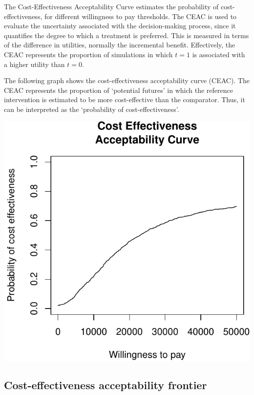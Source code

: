 \documentclass[]{article}
\begin{document}
The Cost-Effectiveness Acceptability Curve estimates the probability of
cost-effectiveness, for different willingness to pay thresholds. The
CEAC is used to evaluate the uncertainty associated with the
decision-making process, since it quantifies the degree to which a
treatment is preferred. This is measured in terms of the difference in
utilities, normally the incremental benefit. Effectively, the CEAC
represents the proportion of simulations in which \(t=1\) is associated
with a higher utility than \(t=0\).

The following graph shows the cost-effectiveness acceptability curve
(CEAC). The CEAC represents the proportion of `potential futures' in
which the reference intervention is estimated to be more cost-effective
than the comparator. Thus, it can be interpreted as the `probability of
cost-effectiveness'.

\begin{center}\includegraphics{report_files/figure-latex/unnamed-chunk-5-1} \end{center}

\hypertarget{cost-effectiveness-acceptability-frontier}{%
\subsection{Cost-effectiveness acceptability
frontier}\label{cost-effectiveness-acceptability-frontier}}
\end{document}
